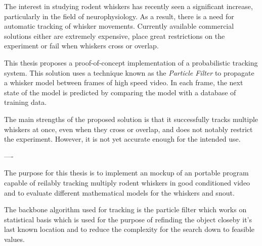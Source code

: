 The interest in studying rodent whiskers has recently seen a significant increase, particularly in the field of neurophysiology. As a result, there is a need for automatic tracking of whisker movements. Currently available commercial solutions either are extremely expensive, place great restrictions on the experiment or fail when whiskers cross or overlap.

This thesis proposes a proof-of-concept implementation of a probabilistic tracking system. This solution uses a technique known as the \emph{Particle Filter} to propagate a whisker model between frames of high speed video. In each frame, the next state of the model is predicted by comparing the model with a database of training data.

The main strengths of the proposed solution is that it successfully tracks multiple whiskers at once, even when they cross or overlap, and does not notably restrict the experiment. However, it is not yet accurate enough for the intended use.

----

The purpose for this thesis is to implement an mockup of an portable 
program capable of reilably tracking multiply rodent whiskers 
in good conditioned video and to evaluate different mathematical 
models for the whiskers and snout. 

The backbone algorithm used 
for tracking is the particle filter which works on statistical basis which
is used for the purpose of refinding the object closeby it's last known location
and to reduce the complexity for the search down to feasible values.
